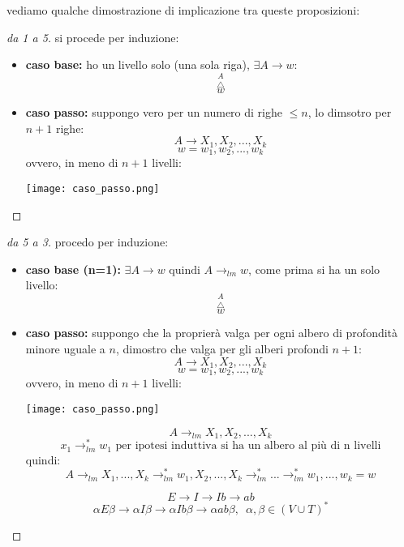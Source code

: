 vediamo qualche dimostrazione di implicazione tra queste proposizioni:
\begin{proof}[da 1 a 5]
	si procede per induzione:
	\begin{itemize}
		\item \textbf{caso base:} ho un livello solo (una sola riga), $\exists A\to w$:
					$$\overset{A}{\overset{\triangle}w}$$
		\item \textbf{caso passo:} suppongo vero per un numero di righe $\leq n$, lo dimsotro per $n+1$ righe:
					$$A\to X_1,X_2,...,X_k$$
					$$w=w_1,w_2,...,w_k$$
					ovvero, in meno di $n+1$ livelli:
					\begin{center}
\texttt{[image: caso\_passo.png]}
					\end{center}
	\end{itemize}
\end{proof}
\begin{proof}[da 5 a 3]
	procedo per induzione:
	\begin{itemize}
		\item \textbf{caso base (n=1): }$\exists A\to w\mbox{ quindi } A\to_{lm}w$, come prima si ha un solo livello:
					$$\overset{A}{\overset{\triangle}w}$$
		\item \textbf{caso passo: }suppongo che la proprierà valga per ogni albero di profondità minore uguale a $n$, dimostro che valga per gli alberi profondi $n+1$:
					$$A\to X_1,X_2,...,X_k$$
					$$w=w_1,w_2,...,w_k$$
					ovvero, in meno di $n+1$ livelli:
					\begin{center}
\texttt{[image: caso\_passo.png]}
					\end{center}
					$$A\to_{lm} X_1,X_2,...,X_k$$
					$$x_1\to^*_{lm}w_1 \mbox{ per ipotesi induttiva si ha un albero al più di n livelli}$$
					quindi:
					$$A\to_{lm}X_1,...,X_k\to^*_{lm}w_1,X_2,...,X_k\to^*_{lm}...\to^*_{lm}w_1,...,w_k=w$$
	\end{itemize}
	\begin{example}
		$$E\to I\to Ib\to ab$$
		$$\alpha E\beta\to\alpha I\beta\to \alpha Ib\beta\to \alpha ab\beta,\,\,\,\alpha,\beta\in(V\cup T)^*$$
	\end{example}
\end{proof}
